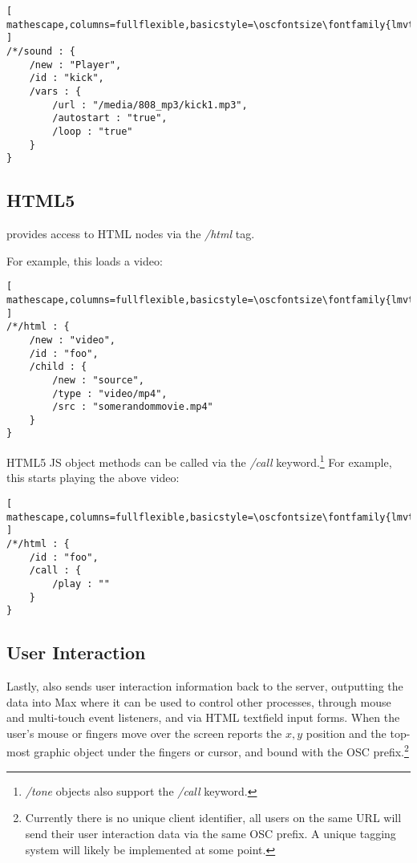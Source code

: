\begin{lstlisting}[ mathescape,columns=fullflexible,basicstyle=\oscfontsize\fontfamily{lmvtt}\selectfont ]
/*/sound : {
    /new : "Player",
    /id : "kick",
    /vars : {
        /url : "/media/808_mp3/kick1.mp3",
        /autostart : "true",
        /loop : "true"
    }
}
\end{lstlisting}


\subsection{HTML5}\label{sec:html}
\drawsocket provides access to HTML nodes via the \textit{/html} tag. 

For example, this loads a video:

\begin{lstlisting}[ mathescape,columns=fullflexible,basicstyle=\oscfontsize\fontfamily{lmvtt}\selectfont ]
/*/html : {
    /new : "video",
    /id : "foo",
    /child : {
        /new : "source",
        /type : "video/mp4",
        /src : "somerandommovie.mp4"
    }
}
\end{lstlisting}

HTML5 JS object methods can be called via the \textit{/call} keyword.\footnote{\textit{/tone} objects also support the \textit{/call} keyword.}
For example, this starts playing the above video:

\begin{lstlisting}[ mathescape,columns=fullflexible,basicstyle=\oscfontsize\fontfamily{lmvtt}\selectfont ]
/*/html : {
    /id : "foo",
    /call : {
        /play : ""
    }
}
\end{lstlisting}


\subsection{User Interaction}\label{sec:interaction}
Lastly, \drawsocket also sends user interaction information back to the server, outputting the data into Max where it can be used to control other processes, through mouse and multi-touch event listeners, and via HTML textfield input forms.
When the user's mouse or fingers move over the screen \drawsocket reports the $x,y$ position and the top-most graphic object under the fingers or cursor, and bound with the OSC prefix.\footnote{Currently there is no unique client identifier, all users on the same URL will send their user interaction data via the same OSC prefix. A unique tagging system will likely be implemented at some point.}

